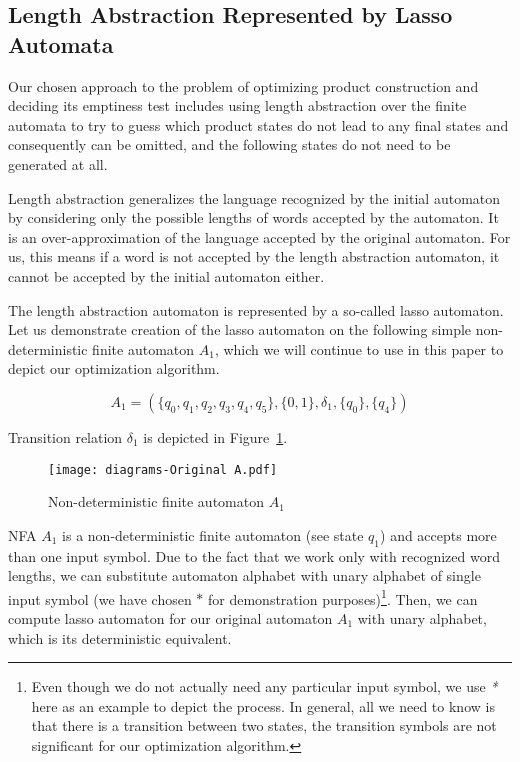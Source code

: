 \subsection{Length Abstraction Represented by Lasso Automata} \label{sec:length_abstraction}

Our chosen approach to the problem of optimizing product construction and deciding its emptiness test includes using length abstraction over the finite automata to try to guess which product states do not lead to any final states and consequently can be omitted, and the following states do not need to be generated at all.

Length abstraction generalizes the language recognized by the initial automaton by considering only the possible lengths of words accepted by the automaton. It is an over-approximation of the language accepted by the original automaton. For us, this means if a word is not accepted by the length abstraction automaton, it cannot be accepted by the initial automaton either.

The length abstraction automaton is represented by a so-called lasso automaton. Let us demonstrate creation of the lasso automaton on the following simple non-deterministic finite automaton $A_1$, which we will continue to use in this paper to depict our optimization algorithm.

$$ A_1 = (\{q_0, q_1, q_2, q_3, q_4, q_5\}, \{0, 1\}, \delta_1, \{q_0\}, \{q_4\}) $$

Transition relation $\delta_1$ is depicted in Figure~\ref{fig:NFA_A1_orig}.

\begin{figure}[ht]
	\centering
	\texttt{[image: diagrams-Original A.pdf]}
	\caption{Non-deterministic finite automaton $A_1$}
	\label{fig:NFA_A1_orig}
\end{figure}

NFA $A_1$ is a non-deterministic finite automaton (see state $q_1$) and accepts more than one input symbol. Due to the fact that we work only with recognized word lengths, we can substitute automaton alphabet with unary alphabet of single input symbol (we have chosen $*$ for demonstration purposes)\footnote{Even though we do not actually need any particular input symbol, we use \emph{*} here as an example to depict the process. In general, all we need to know is that there is a transition between two states, the transition symbols are not significant for our optimization algorithm.}. Then, we can compute lasso automaton for our original automaton $A_1$ with unary alphabet, which is its deterministic equivalent.

